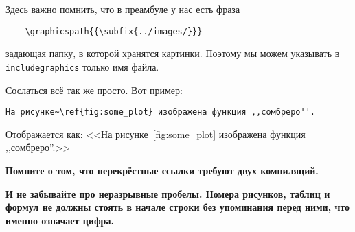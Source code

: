 \documentclass[../homework.tex]{subfiles}
\begin{document}
Здесь важно помнить, что в преамбуле у нас есть фраза
\begin{verbatim}
    \graphicspath{{\subfix{../images/}}}
\end{verbatim}
задающая папку, в которой хранятся картинки.
Поэтому мы можем указывать в \texttt{includegraphics} только имя файла.

Сослаться всё так же просто.
Вот пример:
\begin{verbatim}
На рисунке~\ref{fig:some_plot} изображена функция ,,сомбреро''.
\end{verbatim}
Отображается как: <<На рисунке~\ref{fig:some_plot} изображена функция ,,сомбреро''.>>

\textbf{
    Помните о том, что перекрёстные ссылки требуют двух компиляций.
}

\textbf{
    И не забывайте про неразрывные пробелы.
    Номера рисунков, таблиц и формул не должны стоять в начале строки без упоминания перед ними, что именно означает цифра.
}
\end{document}
